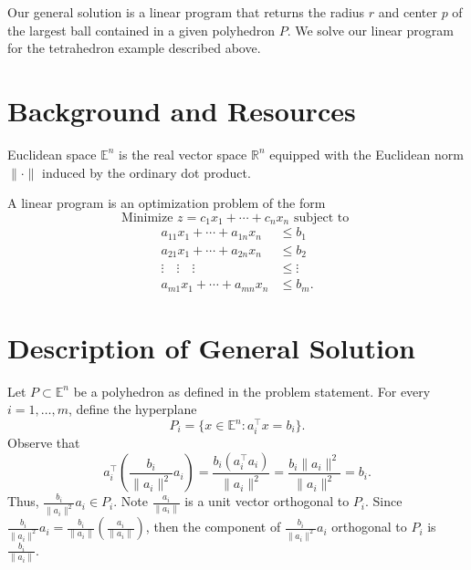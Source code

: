 \documentclass[12pt, a4paper, notitlepage]{report}
\newcommand{\EE}{\mathbb{E}}
\newcommand{\RR}{\mathbb{R}}
\begin{document}
Our general solution is a linear program that returns the radius $r$ and center $p$ of the largest ball contained in a given polyhedron $P$. We solve our linear program for the tetrahedron example described above.

\section{Background and Resources} \label{background}

Euclidean space $\EE^n$ is the real vector space $\RR^n$ equipped with the Euclidean norm $\|\cdot\|$ induced by the ordinary dot product.

A linear program is an optimization problem of the form
\[ \mbox{Minimize } z = c_1x_1+\cdots+c_nx_n \mbox{ subject to } \]
\begin{align*}
a_{11}x_1 + \cdots + a_{1n}x_n &\leq b_1 \\
a_{21}x_1 + \cdots + a_{2n}x_n &\leq b_2 \\
\vdots \quad \vdots \quad \vdots &\leq \vdots \\
a_{m1}x_1 + \cdots + a_{mn}x_n &\leq b_m.
\end{align*}

\section{Description of General Solution} \label{solution}

Let $P\subset\EE^n$ be a polyhedron as defined in the problem statement. For every $i=1,\ldots,m$, define the hyperplane
\[ P_i = \{x\in\EE^n: a_i^\top x = b_i\}. \]
Observe that
\[ a_i^\top\left(\frac{b_i}{\|a_i\|^2} a_i\right)
= \frac{b_i(a_i^\top a_i)}{\|a_i\|^2}
= \frac{b_i\|a_i\|^2}{\|a_i\|^2}
= b_i. \]
Thus, $\frac{b_i}{\|a_i\|^2} a_i\in P_i$. Note $\frac{a_i}{\|a_i\|}$ is a unit vector orthogonal to $P_i$. Since $\frac{b_i}{\|a_i\|^2} a_i = \frac{b_i}{\|a_i\|}\left(\frac{a_i}{\|a_i\|}\right)$, then the component of $\frac{b_i}{\|a_i\|^2} a_i$ orthogonal to $P_i$ is $\frac{b_i}{\|a_i\|}$.
\end{document}
